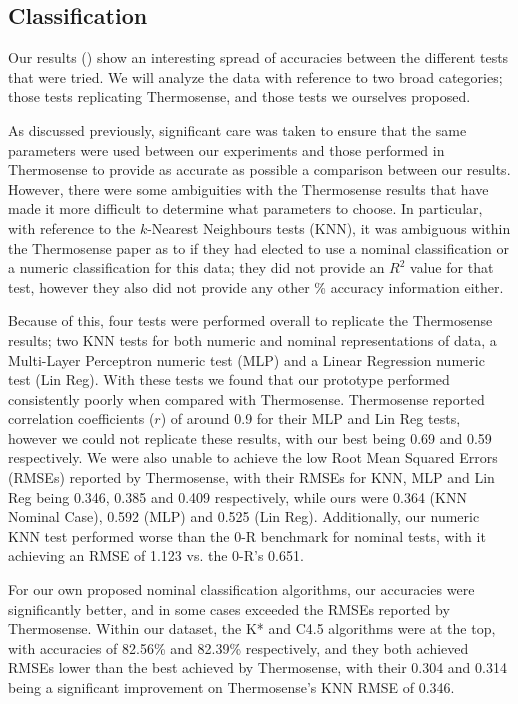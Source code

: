 \documentclass[../thesis/thesis.tex]{subfiles}
\begin{document}
\subsection{Classification}
\label{subsec:classification}

Our results () show an interesting spread of accuracies between the different tests that were tried. We will analyze the data with reference to two broad categories; those tests replicating Thermosense, and those tests we ourselves proposed.

As discussed previously, significant care was taken to ensure that the same parameters were used between our experiments and those performed in Thermosense to provide as accurate as possible a comparison between our results. However, there were some ambiguities with the Thermosense results that have made it more difficult to determine what parameters to choose. In particular, with reference to the $k$-Nearest Neighbours tests (KNN), it was ambiguous within the Thermosense paper as to if they had elected to use a nominal classification or a numeric classification for this data; they did not provide an $R^2$ value for that test, however they also did not provide any other \% accuracy information either.

Because of this, four tests were performed overall to replicate the Thermosense results; two KNN tests for both numeric and nominal representations of data, a Multi-Layer Perceptron numeric test (MLP) and a Linear Regression numeric test (Lin Reg). With these tests we found that our prototype performed consistently poorly when compared with Thermosense. Thermosense reported correlation coefficients ($r$) of around 0.9 for their MLP and Lin Reg tests, however we could not replicate these results, with our best being 0.69 and 0.59 respectively. We were also unable to achieve the low Root Mean Squared Errors (RMSEs) reported by Thermosense, with their RMSEs for KNN, MLP and Lin Reg being 0.346, 0.385 and 0.409 respectively, while ours were 0.364 (KNN Nominal Case), 0.592 (MLP) and 0.525 (Lin Reg). Additionally, our numeric KNN test performed worse than the 0-R benchmark for nominal tests, with it achieving an RMSE of 1.123 vs. the 0-R's 0.651.

For our own proposed nominal classification algorithms, our accuracies were significantly better, and in some cases exceeded the RMSEs reported by Thermosense. Within our dataset, the K* and C4.5 algorithms were at the top, with accuracies of 82.56\% and 82.39\% respectively, and they both achieved RMSEs lower than the best achieved by Thermosense, with their 0.304 and 0.314 being a significant improvement on Thermosense's KNN RMSE of 0.346.
\end{document}
